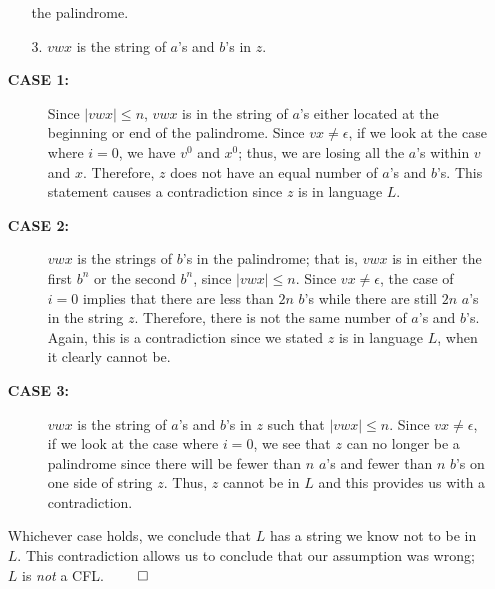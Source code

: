 \documentclass[]{article}
\begin{document}
\begin{enumerate}
\begin{enumerate}
        the palindrome.
        \item[3.] $vwx$ is the string of $a$'s and $b$'s in $z$.
      \end{enumerate}
      \begin{description}
        \item[\textbf{CASE 1:}] Since $|vwx| \leq n$, $vwx$ is in the string of $a
        $'s either located at the beginning or end of the palindrome. Since $vx
        \neq \epsilon$, if we look at the case where $i = 0$, we have $v^0$ and
        $x^0$; thus, we are losing all the $a$'s within $v$ and $x$. Therefore, $z
        $ does not have an equal number of $a$'s and $b$'s. This statement causes
        a contradiction since $z$ is in language $L$.
        \item[\textbf{CASE 2:}] $vwx$ is the strings of $b$'s in the palindrome;
        that is, $vwx$ is in either the first $b^n$ or the second $b^n$, since
        $|vwx| \leq n$. Since $vx \neq \epsilon$, the case of $i = 0$ implies that
        there are less than $2n$ $b$'s while there are still $2n$ $a$'s in the
        string $z$. Therefore, there is not the same number of $a$'s and $b$'s.
        Again, this is a contradiction since we stated $z$ is in language $L$,
        when it clearly cannot be.
        \item[\textbf{CASE 3:}] $vwx$ is the string of $a$'s and $b$'s in $z$ such
        that $|vwx| \leq n$. Since $vx \neq \epsilon$, if we look at the case
        where $i = 0$, we see that $z$ can no longer be a palindrome since there
        will be fewer than $n$ $a$'s and fewer than $n$ $b$'s on one side of
        string $z$. Thus, $z$ cannot be in $L$ and this provides us with a
        contradiction.
      \end{description}
    Whichever case holds, we conclude that $L$ has a string we know not to be in
    $L$. This contradiction allows us to conclude that our assumption was wrong;
    $L$ is \emph{not} a CFL. $\qed$
  \end{enumerate}
\end{document}
